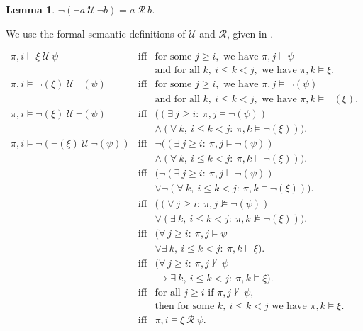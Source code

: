 \documentclass{elsarticle} %
\newtheorem{lem}[thm]{Lemma}
\begin{document}
\begin{lem} \label{Rdef}
$\neg (\neg a \ \mathcal{U} \ \neg b) = a \ \mathcal{R} \ b$.
\end{lem}

\begin{pf}
We use the formal semantic definitions of $\mathcal{U}$ and $\mathcal{R}$, given in \cite{tempReason}.

\begin{eqnarray*}
\pi, i \models \xi \ \mathcal{U} \ \psi &\mbox{iff}& \mbox{for some } j \ge i, \mbox{ we have } \pi, j \models \psi \\
&& \mbox{and for all } k, \ i \le k < j, \mbox{ we have } \pi, k \models \xi.\\
\pi, i \models \neg(\xi) \ \mathcal{U} \ \neg(\psi) &\mbox{iff}& \mbox{for some } j \ge i, \mbox{ we have } \pi, j \models \neg(\psi) \\
&& \mbox{and for all } k, \ i \le k < j, \mbox{ we have } \pi, k \models \neg(\xi).\\
\pi, i \models \neg(\xi) \ \mathcal{U} \ \neg(\psi) &\mbox{iff}& (( \exists \ j \ge i : \  \pi, j \models \neg(\psi) ) \\
&& \wedge ( \forall \ k, \ i \le k < j : \  \pi, k \models \neg(\xi) ) ).\\
\pi, i \models \neg(\neg(\xi) \ \mathcal{U} \ \neg(\psi)) &\mbox{iff}& \neg(( \exists \ j \ge i : \  \pi, j \models \neg(\psi) ) \\
&& \wedge ( \forall \ k, \ i \le k < j : \  \pi, k \models \neg(\xi) ) ).\\
&\mbox{iff}& (\neg( \exists \ j \ge i : \  \pi, j \models \neg(\psi) ) \\
&& \vee \neg ( \forall \ k, \ i \le k < j : \  \pi, k \models \neg(\xi) ) ).\\
&\mbox{iff}& (( \forall \ j \ge i : \  \pi, j \not\models \neg(\psi) ) \\
&& \vee ( \exists \ k, \ i \le k < j : \  \pi, k \not\models \neg(\xi) ) ).\\
&\mbox{iff}& (\forall \ j \ge i : \  \pi, j \models \psi  \\
&& \vee \exists \ k, \ i \le k < j : \  \pi, k \models \xi).\\
&\mbox{iff}& (\forall \ j \ge i : \  \pi, j \not\models \psi  \\
&& \rightarrow \exists \ k, \ i \le k < j : \  \pi, k \models \xi).\\
&\mbox{iff}& \mbox{for all } j \ge i \mbox{ if } \pi, j \not\models \psi,  \\
&& \mbox{then for some } k, \ i \le k < j \mbox{ we have } \pi, k \models \xi.\\
&\mbox{iff}& \pi, i \models \xi \ \mathcal{R} \ \psi.
\end{eqnarray*}
\end{pf}
\end{document}
